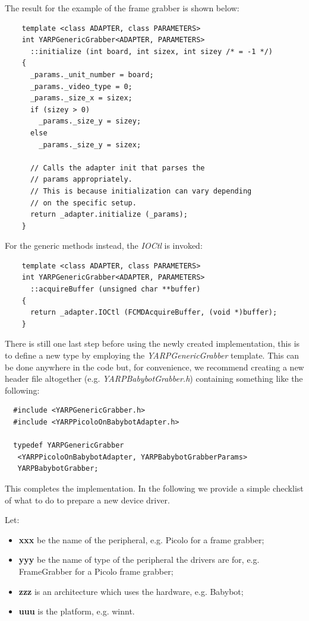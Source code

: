 The result for the example of the frame grabber is shown below:

\begin{verbatim}
    template <class ADAPTER, class PARAMETERS>
    int YARPGenericGrabber<ADAPTER, PARAMETERS>
      ::initialize (int board, int sizex, int sizey /* = -1 */)
    {
      _params._unit_number = board;
      _params._video_type = 0;
      _params._size_x = sizex;
      if (sizey > 0)
        _params._size_y = sizey;
      else
        _params._size_y = sizex;

      // Calls the adapter init that parses the 
      // params appropriately.
      // This is because initialization can vary depending 
      // on the specific setup.
      return _adapter.initialize (_params);
    }
\end{verbatim}

For the generic methods instead, the {\em IOCtl} is invoked:
\begin{verbatim}
    template <class ADAPTER, class PARAMETERS>
    int YARPGenericGrabber<ADAPTER, PARAMETERS>
      ::acquireBuffer (unsigned char **buffer)
    {
      return _adapter.IOCtl (FCMDAcquireBuffer, (void *)buffer);
    }
\end{verbatim}

There is still one last step before using the newly created implementation, this is to define a new type by employing the {\em YARPGenericGrabber} template. This can be done anywhere in the code but, for convenience, we recommend creating a new header file altogether (e.g. {\em YARPBabybotGrabber.h}) containing something like the following:

\begin{verbatim}
  #include <YARPGenericGrabber.h>
  #include <YARPPicoloOnBabybotAdapter.h>

  typedef YARPGenericGrabber
   <YARPPicoloOnBabybotAdapter, YARPBabybotGrabberParams> 
   YARPBabybotGrabber;
\end{verbatim}

This completes the implementation. In the following we provide a simple checklist of what to do to prepare a new device driver.
 
 
Let:
\begin{itemize}
\item {\bf xxx} be the name of the peripheral, e.g. Picolo for a frame grabber;
\item {\bf yyy} be the name of type of the peripheral the drivers are for, e.g. FrameGrabber for a Picolo frame grabber;
\item {\bf zzz} is an architecture which uses the hardware, e.g. Babybot;
\item {\bf uuu} is the platform, e.g. winnt.
\end{itemize}

